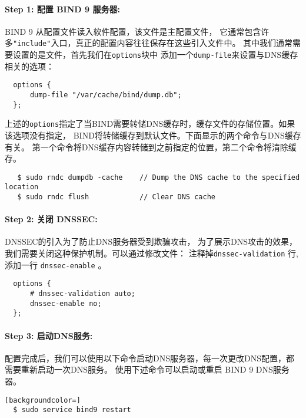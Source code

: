 \paragraph{Step 1: 配置 BIND 9 服务器:}
BIND 9 从配置文件读入软件配置，该文件是主配置文件，
它通常包含许多\texttt{"include"}入口，真正的配置内容往往保存在这些引入文件中。
其中我们通常需要设置的是文件，首先我们在\texttt{options}块中
添加一个\texttt{dump-file}来设置与DNS缓存相关的选项：

\begin{lstlisting}
  options {
      dump-file "/var/cache/bind/dump.db";
  };
\end{lstlisting}


上述的\texttt{options}指定了当BIND需要转储DNS缓存时，缓存文件的存储位置。如果该选项没有指定，
BIND将转储缓存到默认文件。下面显示的两个命令与DNS缓存有关。
第一个命令将DNS缓存内容转储到之前指定的位置，第二个命令将清除缓存。


\begin{lstlisting}
   $ sudo rndc dumpdb -cache    // Dump the DNS cache to the specified location
   $ sudo rndc flush            // Clear DNS cache
\end{lstlisting}


\paragraph{Step 2: 关闭 DNSSEC:}
DNSSEC的引入为了防止DNS服务器受到欺骗攻击，
为了展示DNS攻击的效果，我们需要关闭这种保护机制。可以通过修改文件：
注释掉{\tt dnssec-validation} 行,添加一行
{\tt dnssec-enable} 。

\begin{lstlisting}
  options {
      # dnssec-validation auto;
      dnssec-enable no;
  };
\end{lstlisting}


\paragraph{Step 3: 启动DNS服务:}
配置完成后，我们可以使用以下命令启动DNS服务器，每一次更改DNS配置，都需要重新启动一次DNS服务。
使用下述命令可以启动或重启 BIND 9 DNS服务器。

\begin{lstlisting}[backgroundcolor=]
  $ sudo service bind9 restart
\end{lstlisting}


